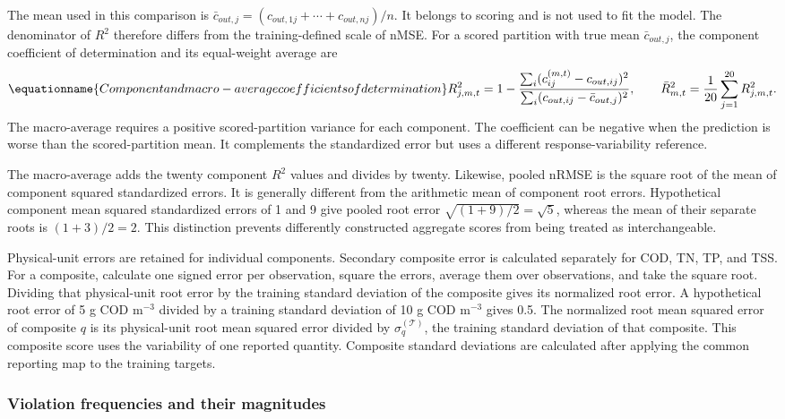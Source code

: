 The mean used in this comparison is $\bar c_{out,j}=(c_{out,1j}+\cdots+c_{out,nj})/n$. It belongs to scoring and is not used to fit the model. The denominator of $R^2$ therefore differs from the training-defined scale of nMSE. For a scored partition with true mean $\bar c_{out,j}$, the component coefficient of determination and its equal-weight average are
\begin{equation}
\equationname{Component and macro-average coefficients of determination}
R_{j,m,t}^2=1-
\frac{\sum_i(c_{ij}^{(m,t)}-c_{out,ij})^2}
{\sum_i(c_{out,ij}-\bar c_{out,j})^2},\qquad
\bar R_{m,t}^2=\frac{1}{20}\sum_{j=1}^{20}R_{j,m,t}^2.
\label{eq:projection_r_squared}
\end{equation}
The macro-average requires a positive scored-partition variance for each component. The coefficient can be negative when the prediction is worse than the scored-partition mean. It complements the standardized error but uses a different response-variability reference.

The macro-average adds the twenty component $R^2$ values and divides by twenty. Likewise, pooled nRMSE is the square root of the mean of component squared standardized errors. It is generally different from the arithmetic mean of component root errors. Hypothetical component mean squared standardized errors of 1 and 9 give pooled root error $\sqrt{(1+9)/2}=\sqrt5$, whereas the mean of their separate roots is $(1+3)/2=2$. This distinction prevents differently constructed aggregate scores from being treated as interchangeable.

Physical-unit errors are retained for individual components. Secondary composite error is calculated separately for COD, TN, TP, and TSS. For a composite, calculate one signed error per observation, square the errors, average them over observations, and take the square root. Dividing that physical-unit root error by the training standard deviation of the composite gives its normalized root error. A hypothetical root error of 5 g COD m$^{-3}$ divided by a training standard deviation of 10 g COD m$^{-3}$ gives 0.5. The normalized root mean squared error of composite $q$ is its physical-unit root mean squared error divided by $\sigma_q^{(\mathcal{T})}$, the training standard deviation of that composite. This composite score uses the variability of one reported quantity. Composite standard deviations are calculated after applying the common reporting map to the training targets.

\subsubsection{Violation frequencies and their magnitudes}

